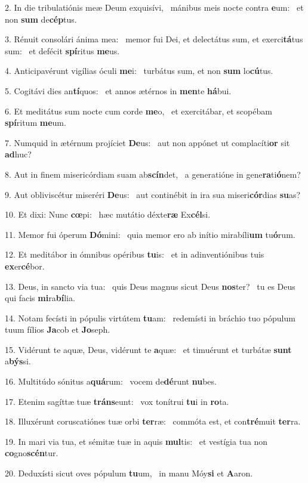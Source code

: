 2. In die tribulatiónis meæ Deum exquisívi, \dag\  mánibus meis nocte contra \textbf{e}um: \ast\  et non \textbf{sum} de\textbf{cép}tus.\

3. Rénuit consolári ánima mea: \dag\  memor fui Dei, et delectátus sum, et exerci\textbf{tá}tus sum: \ast\  et defécit \textbf{spí}ritus \textbf{me}us.\

4. Anticipavérunt vigílias óculi \textbf{me}i: \ast\  turbátus sum, et non \textbf{sum} lo\textbf{cú}tus.\

5. Cogitávi dies an\textbf{tí}quos: \ast\  et annos ætérnos in \textbf{men}te \textbf{há}bui.\

6. Et meditátus sum nocte cum corde \textbf{me}o, \ast\  et exercitábar, et scopébam \textbf{spí}ritum \textbf{me}um.\

7. Numquid in ætérnum projíciet \textbf{De}us: \ast\  aut non appónet ut complacíti\textbf{or} sit \textbf{ad}huc?\

8. Aut in finem misericórdiam suam ab\textbf{scín}det, \ast\  a generatióne in gene\textbf{ra}ti\textbf{ó}nem?\

9. Aut obliviscétur miseréri \textbf{De}us: \ast\  aut continébit in ira sua miseri\textbf{cór}dias \textbf{su}as?\

10. Et dixi: Nunc \textbf{cœ}pi: \ast\  hæc mutátio déxte\textbf{ræ} Ex\textbf{cél}si.\

11. Memor fui óperum \textbf{Dó}mini: \ast\  quia memor ero ab inítio mirabíli\textbf{um} tu\textbf{ó}rum.\

12. Et meditábor in ómnibus opéribus \textbf{tu}is: \ast\  et in adinventiónibus tuis \textbf{ex}er\textbf{cé}bor.\

13. Deus, in sancto via tua: \dag\  quis Deus magnus sicut Deus \textbf{nos}ter? \ast\  tu es Deus qui facis \textbf{mi}ra\textbf{bí}lia.\

14. Notam fecísti in pópulis virtútem \textbf{tu}am: \ast\  redemísti in bráchio tuo pópulum tuum fílios \textbf{Ja}cob et \textbf{Jo}seph.\

15. Vidérunt te aquæ, Deus, vidérunt te \textbf{a}quæ: \ast\  et timuérunt et turbátæ \textbf{sunt} a\textbf{býs}si.\

16. Multitúdo sónitus a\textbf{quá}rum: \ast\  vocem de\textbf{dé}runt \textbf{nu}bes.\

17. Etenim sagíttæ tuæ \textbf{tráns}eunt: \ast\  vox tonítrui \textbf{tu}i in \textbf{ro}ta.\

18. Illuxérunt coruscatiónes tuæ orbi \textbf{ter}ræ: \ast\  commóta est, et con\textbf{tré}muit \textbf{ter}ra.\

19. In mari via tua, et sémitæ tuæ in aquis \textbf{mul}tis: \ast\  et vestígia tua non \textbf{co}gno\textbf{scén}tur.\

20. Deduxísti sicut oves pópulum \textbf{tu}um, \ast\  in manu Móy\textbf{si} et \textbf{A}aron.\

